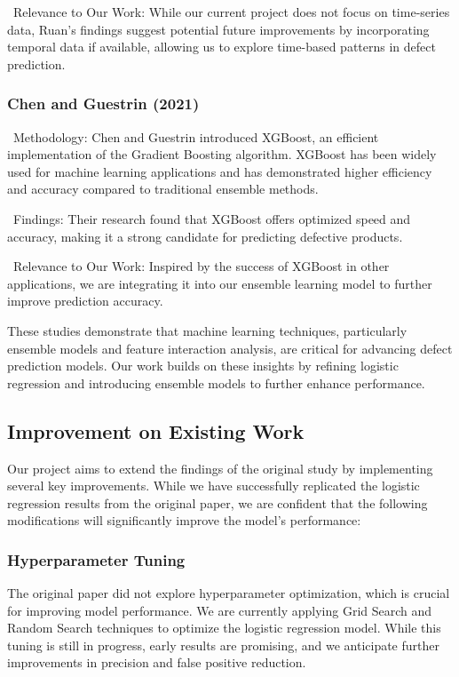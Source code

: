 \documentclass[conference]{IEEEtran}
\begin{document}
\noindent \textbullet\ Relevance to Our Work: While our current project does not focus on time-series data, Ruan’s findings suggest potential future improvements by incorporating temporal data if available, allowing us to explore time-based patterns in defect prediction.

\subsubsection{Chen and Guestrin (2021) \cite{xgboost2021example}}

\noindent \textbullet\ Methodology: Chen and Guestrin introduced XGBoost, an efficient implementation of the Gradient Boosting algorithm. XGBoost has been widely used for machine learning applications and has demonstrated higher efficiency and accuracy compared to traditional ensemble methods.

\noindent \textbullet\ Findings: Their research found that XGBoost offers optimized speed and accuracy, making it a strong candidate for predicting defective products.

\noindent \textbullet\ Relevance to Our Work: Inspired by the success of XGBoost in other applications, we are integrating it into our ensemble learning model to further improve prediction accuracy.

These studies demonstrate that machine learning techniques, particularly ensemble models and feature interaction analysis, are critical for advancing defect prediction models. Our work builds on these insights by refining logistic regression and introducing ensemble models to further enhance performance.

\subsection{Improvement on Existing Work}

Our project aims to extend the findings of the original study by implementing several key improvements. While we have successfully replicated the logistic regression results from the original paper, we are confident that the following modifications will significantly improve the model’s performance:

\subsubsection{Hyperparameter Tuning}

The original paper did not explore hyperparameter optimization, which is crucial for improving model performance. We are currently applying Grid Search and Random Search techniques to optimize the logistic regression model. While this tuning is still in progress, early results are promising, and we anticipate further improvements in precision and false positive reduction.
\end{document}
